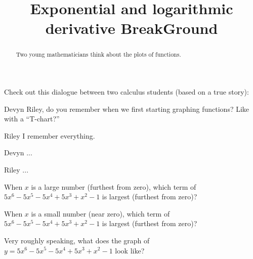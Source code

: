 \documentclass{ximera}
\title[Break-Ground:]{Exponential and logarithmic derivative BreakGround}
\begin{document}
\begin{abstract}
  Two young mathematicians think about the plots of functions.
\end{abstract}
\maketitle

Check out this dialogue between two calculus students (based on a true
story):

\begin{dialogue}
\item[Devyn] Riley, do you remember when we first starting graphing
  functions? Like with a ``T-chart?''
\item[Riley] I remember everything.
\item[Devyn] ...
\item[Riley] ...
\end{dialogue}

\begin{problem}
  When $x$ is a large number (furthest from zero), which term of
  $5x^6-5x^5-5x^4+5x^3+x^2 -1$ is largest (furthest from zero)?
  \begin{multipleChoice}
  \end{multipleChoice}
\end{problem}

\begin{problem}
  When $x$ is a small number (near zero), which term of
  $5x^6-5x^5-5x^4+5x^3+x^2 -1$ is largest (furthest from zero)?
  \begin{multipleChoice}
  \end{multipleChoice}
\end{problem}


\begin{problem}
  Very roughly speaking, what does the graph of
  $y=5x^6-5x^5-5x^4+5x^3+x^2 -1$ look like?
  \begin{multipleChoice}
  \end{multipleChoice}
\end{problem}




\end{document}

